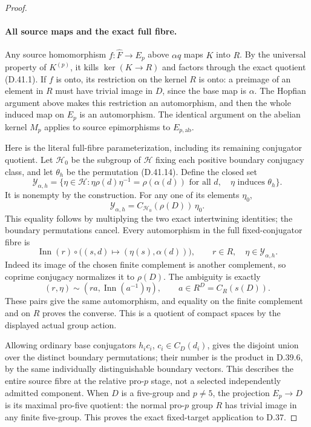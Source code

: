 \begin{proof}
\paragraph{All source maps and the exact full fibre.}
Any source homomorphism
\(f:\widehat F\to E_p\) above
\(\alpha q\) maps \(K\) into \(R\).
By the universal property of
\(K^{(p)}\), it kills \(\ker(K\to R)\)
and factors through the exact quotient
\textup{(D.41.1)}.
If \(f\) is onto, its restriction
on the kernel \(R\) is onto: a
preimage of an element in \(R\)
must have trivial image in \(D\),
since the base map is \(\alpha\).
The Hopfian argument above makes
this restriction an automorphism,
and then the whole induced map on
\(E_p\) is an automorphism.
The identical argument on the
abelian kernel \(M_p\) applies to
source epimorphisms to
\(E_{p,\mathrm{ab}}\).

Here is the literal full-fibre
parameterization, including its
remaining conjugator quotient.
Let \(\mathcal H_0\) be the subgroup
of \(\mathcal H\) fixing each positive
boundary conjugacy class, and let
\(\theta_h\) be the permutation
\textup{(D.41.14)}.
Define the closed set
\[
 \mathcal Y_{\alpha,h}=
 \{\eta\in\mathcal H:
   \eta\rho(d)\eta^{-1}=\rho(\alpha(d))
       \text{ for all }d,\quad
   \eta\text{ induces }\theta_h\}.
 \tag{D.41.21}
\]
It is nonempty by the construction.
For any one of its elements \(\eta_0\),
\[
 \mathcal Y_{\alpha,h}
      =C_{\mathcal H_0}(\rho(D))\,\eta_0.
 \tag{D.41.22}
\]
This equality follows by multiplying
the two exact intertwining identities;
the boundary permutations cancel.
Every automorphism in the full
fixed-conjugator fibre is
\[
      \operatorname{Inn}(r)\circ
          \bigl((s,d)\mapsto(\eta(s),\alpha(d))\bigr),
         \qquad r\in R,\quad
                \eta\in\mathcal Y_{\alpha,h}.
 \tag{D.41.23}
\]
Indeed its image of the chosen
finite complement is another
complement, so coprime conjugacy
normalizes it to \(\rho(D)\).
The ambiguity is exactly
\[
 (r,\eta)\sim
       (ra,\operatorname{Inn}(a^{-1})\eta),
       \qquad
       a\in R^D=C_R(s(D)).
 \tag{D.41.24}
\]
These pairs give the same automorphism,
and equality on the finite complement
and on \(R\) proves the converse.
This is a quotient of compact spaces
by the displayed actual group action.

Allowing ordinary base conjugators
\(h_ic_i\), \(c_i\in C_D(d_i)\),
gives the disjoint union over the
distinct boundary permutations;
their number is the product in
D.39.6, by the same individually
distinguishable boundary vectors.
This describes the entire source
fibre at the relative pro-\(p\)
stage, not a selected independently
admitted component.
When \(D\) is a five-group and
\(p\ne5\), the projection \(E_p\to D\)
is its maximal pro-five quotient:
the normal pro-\(p\) group \(R\)
has trivial image in any finite
five-group.  This proves the exact
fixed-target application to D.37.
\end{proof}

